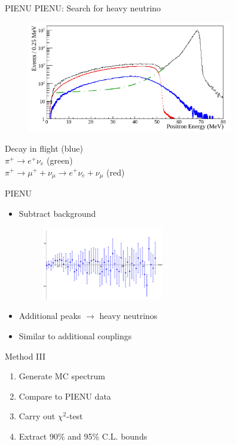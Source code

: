 \documentclass[11pt]{beamer}
\numberwithin{equation}{section}
\begin{document}
\begin{frame}{PIENU}
PIENU: Search for heavy neutrino  \cite{Aguilar-Arevalo:2017vlf}
\begin{figure}[H]
  \centering
    \includegraphics[width=0.8\textwidth]{../imgs/graph}
\end{figure}
Decay in flight (blue)\\ $\pi^+\rightarrow e^+\nu_e$ (green) \\ $\pi^+\rightarrow \mu^++\nu_\mu \rightarrow e^+ \nu_e +\nu_\mu$ (red)
\end{frame}

\begin{frame}{PIENU}
\begin{itemize}
\item Subtract background
\begin{figure}[H]
  \centering
    \includegraphics[width=0.5\textwidth]{../imgs/PIENUDataRaw}
\end{figure}
\pause
\item Additional peaks $\rightarrow$ heavy neutrinos
\pause
\item Similar to additional couplings
\end{itemize}
\end{frame}

\begin{frame}{Method III}
\begin{enumerate}
\item Generate MC spectrum
\pause
\item Compare to PIENU data
\pause
\item Carry out $\chi^2$-test
\pause
\item Extract 90\% and 95\% C.L. bounds
\end{enumerate}
\end{frame}
\end{document}

